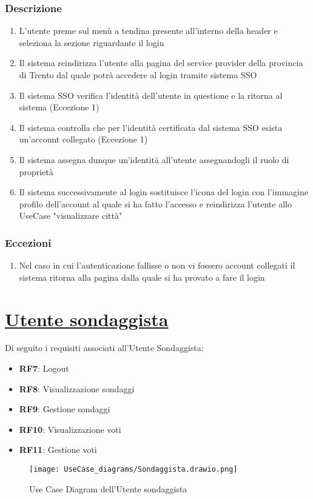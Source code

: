         \subsubsection{Descrizione}
            \begin{enumerate}
                \item L'utente preme sul menù a tendina presente all'interno della header e seleziona la sezione riguardante il login
                \item Il sistema reindirizza l'utente alla pagina del service provider della provincia di Trento dal quale potrà accedere al login tramite sistema SSO
                \item Il sistema SSO verifica l'identità dell'utente in questione e la ritorna al sistema (Eccezione 1)
                \item Il sistema controlla che per l'identità certificata dal sistema SSO esista un'account collegato (Eccezione 1)
                \item Il sistema assegna dunque un'identità all'utente assegnandogli il ruolo di proprietà
                \item Il sistema successivamente al login sostituisce l'icona del login con l'immagine profilo dell'account al quale si ha fatto l'accesso e reindirizza l'utente allo UseCase "visualizzare città"
            \end{enumerate}
        \subsubsection{Eccezioni}
            \begin{enumerate}
                \item Nel caso in cui l'autenticazione fallisse o non vi fossero account collegati il sistema ritorna alla pagina dalla quale si ha provato a fare il login
            \end{enumerate}


\section{\underline{Utente sondaggista}}
    Di seguito i requisiti associati all'Utente Sondaggista:
    \begin{itemize}
        \item \textbf{RF7}: Logout
        \item \textbf{RF8}: Visualizzazione sondaggi
        \item \textbf{RF9}: Gestione sondaggi
        \item \textbf{RF10}: Visualizzazione voti
        \item \textbf{RF11}: Gestione voti
    \end{itemize}
    \begin{figure}[H]
        \centering
        \texttt{[image: UseCase\_diagrams/Sondaggista.drawio.png]}
        \caption{Use Case Diagram dell'Utente sondaggista}
    \end{figure}

